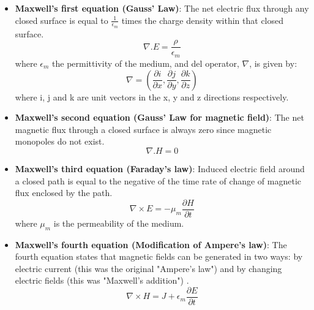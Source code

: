 \documentclass[../report.tex]{subfiles}
\begin{document}
\begin{itemize}	
	\item \textbf{Maxwell's first equation (Gauss' Law)}: The net electric flux through any closed surface is equal to $\frac{1}{\epsilon_m}$ times the charge density within that closed surface.
	\begin{equation}\label{eq:max1_1}
	\nabla.E = \frac{\rho}{\epsilon_m}	
	\end{equation}
	where $\epsilon_m$ the permittivity of the medium, and del operator, $\nabla$, is given by:
	\begin{equation}\label{eq:max1_2}
	\nabla = \left(\frac{\partial i}{\partial x},\frac{\partial j}{\partial y},\frac{\partial k}{\partial z}\right)
	\end{equation}
	where i, j and k are unit vectors in the x, y and z directions respectively.
	
	\item \textbf{Maxwell's second equation (Gauss' Law for magnetic field)}: The net magnetic flux through a closed surface is always zero since magnetic monopoles do not exist.
	\begin{equation}\label{eq:max1_3}
	\nabla.H = 0	
	\end{equation}
	
	\item \textbf{Maxwell's third equation (Faraday's law)}: Induced electric field around a closed path is equal to the negative of the time rate of change of magnetic flux enclosed by the path.
	\begin{equation}\label{eq:max1_4}
	\nabla\times E = -\mu_m\frac{\partial H}{\partial t}
	\end{equation}
	where $\mu_m$ is the permeability of the medium.
	
	\item \textbf{Maxwell's fourth equation (Modification of Ampere's law)}:  The fourth equation states that magnetic fields can be generated in two ways: by electric current (this was the original "Ampere's law") and by changing electric fields (this was "Maxwell's addition") \cite{wiki_maxwells_2016}.
	\begin{equation}\label{eq:max1_5}
	\nabla\times H =  J + \epsilon_m\frac{\partial E}{\partial t}	
	\end{equation}	
\end{itemize}
\end{document}
